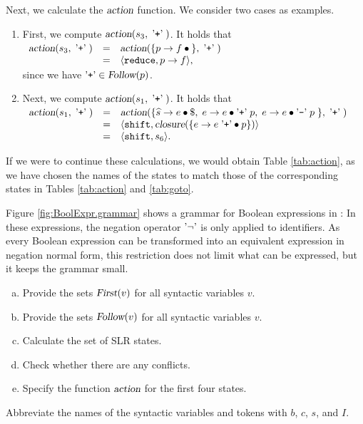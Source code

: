 Next, we calculate the \(\textsl{action}\) function. We consider two cases as examples.
\begin{enumerate}
\item First, we compute \(\textsl{action}(s_3, \;\mbox{'\texttt{+}'}\;)\). It holds that
      \\[0.2cm]
      \hspace*{1.3cm}
      \(
      \begin{array}[t]{lcl}
      \textsl{action}(s_3, \aquoted{+}) & = &
            \textsl{action}(\{p \rightarrow f \mdot\}, \aquoted{+}) \\
      & = & \langle \texttt{reduce}, p \rightarrow f \rangle,
      \end{array}
      \)
\\[0.2cm]
      since we have \(\mbox{'\texttt{+}'} \in \textsl{Follow}(p)\).
\item Next, we compute \(\textsl{action}(s_1, \;\mbox{'\texttt{+}'}\;)\). It holds that
      \\[0.2cm]
      \hspace*{1.3cm}
      \(
      \begin{array}[t]{lcl}
      \textsl{action}(s_1, \aquoted{+}) & = &
            \textsl{action}(\{ \widehat{s} \rightarrow e \mdot\symbol{36},\;
                 e \rightarrow e \mdot \saquoted{+}\; p,\; 
                 e \rightarrow e \mdot \saquoted{-}\; p \; \}, \aquoted{+}) \\
      & = & \langle \texttt{shift}, \textsl{closure}(\{ e \rightarrow e \;\saquoted{+} \mdot p\}) \rangle \\
      & = & \langle \texttt{shift}, s_6 \rangle.
      \end{array}
      \)
\end{enumerate}
If we were to continue these calculations, we would obtain Table \ref{tab:action}, as we have chosen the names
of the states to match those of the corresponding states in Tables \ref{tab:action} and \ref{tab:goto}. 

\exerciseEng\label{exercise:bool-slr}
Figure \ref{fig:BoolExpr.grammar} shows a grammar for Boolean expressions in :  In these expressions, the negation operator $\mbox{'$\neg$'}$ is only applied to
identifiers.  As every Boolean expression can be transformed into an equivalent expression in negation normal form,
this restriction does not limit what can be expressed, but it keeps the grammar small.
\begin{enumerate}[(a)]
\item Provide the sets \(\textsl{First}(v)\) for all syntactic variables \(v\).
\item Provide the sets \(\textsl{Follow}(v)\) for all syntactic variables \(v\).
\item Calculate the set of SLR states.
\item Check whether there are any conflicts.
\item Specify the function \(\textsl{action}\) for the first four states.
\end{enumerate}
Abbreviate the names of the syntactic variables and tokens with \(b\), \(c\), \(s\), and \(I\).
\eox 

